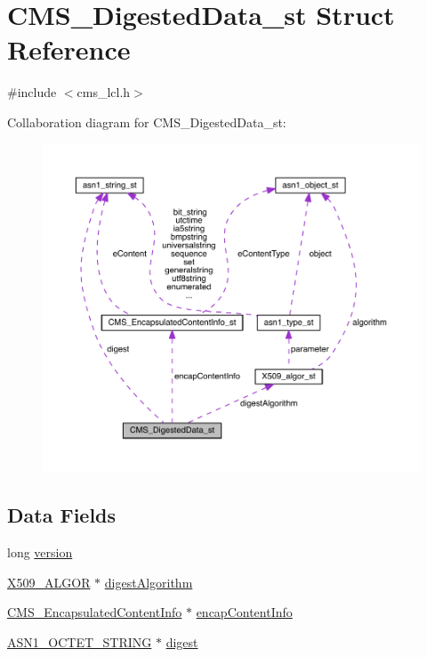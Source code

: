 \hypertarget{struct_c_m_s___digested_data__st}{}\section{C\+M\+S\+\_\+\+Digested\+Data\+\_\+st Struct Reference}
\label{struct_c_m_s___digested_data__st}


{\ttfamily \#include $<$cms\+\_\+lcl.\+h$>$}



Collaboration diagram for C\+M\+S\+\_\+\+Digested\+Data\+\_\+st\+:\nopagebreak
\begin{figure}[H]
\begin{center}
\leavevmode
\includegraphics[width=350pt]{struct_c_m_s___digested_data__st__coll__graph}
\end{center}
\end{figure}
\subsection*{Data Fields}
\begin{DoxyCompactItemize}
\item 
long \hyperlink{struct_c_m_s___digested_data__st_a17afc5cf84cee4b2123665f28ce85c9f}{version}
\item 
\hyperlink{crypto_2ossl__typ_8h_aa2b6185e6254f36f709cd6577fb5022e}{X509\+\_\+\+A\+L\+G\+OR} $\ast$ \hyperlink{struct_c_m_s___digested_data__st_a3db9734e20b06af31aabcfcfc6b62797}{digest\+Algorithm}
\item 
\hyperlink{cms__lcl_8h_a43d5fbe8d3d48436737af5049d312acc}{C\+M\+S\+\_\+\+Encapsulated\+Content\+Info} $\ast$ \hyperlink{struct_c_m_s___digested_data__st_a436b5725775d32c6f9a979b8d5a4f8b5}{encap\+Content\+Info}
\item 
\hyperlink{crypto_2ossl__typ_8h_afbd05e94e0f0430a2b729473efec88c1}{A\+S\+N1\+\_\+\+O\+C\+T\+E\+T\+\_\+\+S\+T\+R\+I\+NG} $\ast$ \hyperlink{struct_c_m_s___digested_data__st_af56d3df2c422e27091046e5cb803bc4a}{digest}
\end{DoxyCompactItemize}


